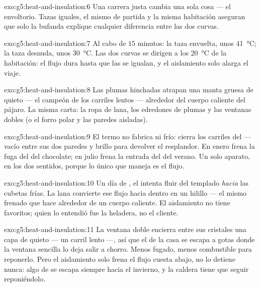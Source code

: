 \begin{solution}{exo:g5:heat-and-insulation:6}
Una carrera justa cambia una sola cosa --- el envoltorio. Tazas
iguales, el mismo  de partida y la misma habitación aseguran
que solo la bufanda explique cualquier diferencia entre las dos
curvas.
\end{solution}

\begin{solution}{exo:g5:heat-and-insulation:7}
Al cabo de $15$ minutos: la taza envuelta, unos \qty{41}{\celsius}; la
taza desnuda, unos \qty{30}{\celsius}. Las dos curvas se dirigen a los
\qty{20}{\celsius} de la habitación: el flujo dura hasta que las
 se igualan, y el aislamiento solo alarga el viaje.
\end{solution}

\begin{solution}{exo:g5:heat-and-insulation:8}
Las plumas hinchadas atrapan una manta gruesa de  quieto --- el
campeón de los carriles lentos --- alrededor del cuerpo caliente del
pájaro. La misma carta: la ropa de lana, los edredones de plumas y las
ventanas dobles (o el forro polar y las paredes aisladas).
\end{solution}

\begin{solution}{exo:g5:heat-and-insulation:9}
El termo no fabrica  ni frío: cierra los carriles del
 --- vacío entre sus dos paredes y brillo para devolver el
resplandor. En enero frena la fuga del  del chocolate; en
julio frena la entrada del  del verano. Un solo aparato, en
los dos sentidos, porque lo único que maneja es el flujo.
\end{solution}

\begin{solution}{exo:g5:heat-and-insulation:10}
Un día de , el  intenta fluir del  templado
\emph{hacia} las cubetas frías. La lana convierte ese flujo hacia
dentro en un hilillo --- el mismo frenado que hace alrededor de un
cuerpo caliente. El aislamiento no tiene favoritos; quien lo entendió
fue la heladera, no el cliente.
\end{solution}

\begin{solution}{exo:g5:heat-and-insulation:11}
La ventana doble encierra entre sus cristales una capa de 
quieto --- un carril lento ---, así que el  de la casa se
escapa a gotas donde la ventana sencilla lo deja salir a chorro. Menos
 fugado, menos combustible para reponerlo. Pero el
aislamiento solo frena el flujo cuesta abajo, no lo detiene nunca:
algo de  se escapa siempre hacia el invierno, y la caldera
tiene que seguir reponiéndolo.
\end{solution}
